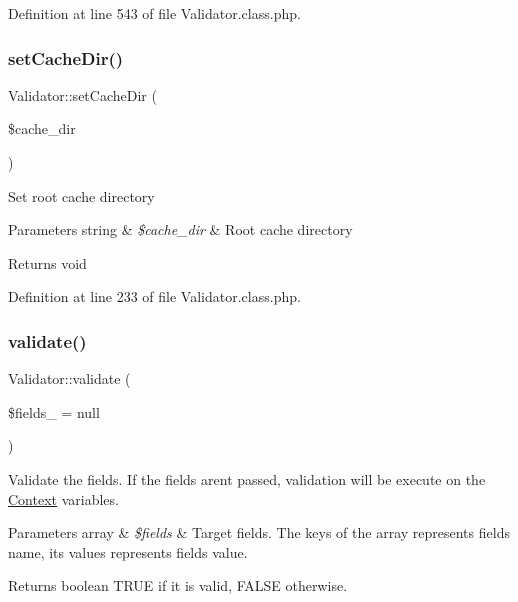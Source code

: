 Definition at line 543 of file Validator.\+class.\+php.

\hypertarget{classValidator_a1630131530dca60428e72dd4dd2d4af3}{}\label{classValidator_a1630131530dca60428e72dd4dd2d4af3} 
\subsubsection{\texorpdfstring{set\+Cache\+Dir()}{setCacheDir()}}
{\footnotesize\ttfamily Validator\+::set\+Cache\+Dir (\begin{DoxyParamCaption}\item[{}]{\$cache\+\_\+dir }\end{DoxyParamCaption})}

Set root cache directory 
\begin{DoxyParams}[1]{Parameters}
string & {\em \$cache\+\_\+dir} & Root cache directory \\
\hline
\end{DoxyParams}
\begin{DoxyReturn}{Returns}
void 
\end{DoxyReturn}


Definition at line 233 of file Validator.\+class.\+php.

\hypertarget{classValidator_a05e34dac507b8d719e7f95f2cd0220bc}{}\label{classValidator_a05e34dac507b8d719e7f95f2cd0220bc} 
\subsubsection{\texorpdfstring{validate()}{validate()}}
{\footnotesize\ttfamily Validator\+::validate (\begin{DoxyParamCaption}\item[{}]{\$fields\+\_\+ = {\ttfamily null} }\end{DoxyParamCaption})}

Validate the fields. If the fields aren\textquotesingle{}t passed, validation will be execute on the \hyperlink{classContext}{Context} variables. 
\begin{DoxyParams}[1]{Parameters}
array & {\em \$fields} & Target fields. The keys of the array represents field\textquotesingle{}s name, its values represents field\textquotesingle{}s value. \\
\hline
\end{DoxyParams}
\begin{DoxyReturn}{Returns}
boolean T\+R\+UE if it is valid, F\+A\+L\+SE otherwise. 
\end{DoxyReturn}


